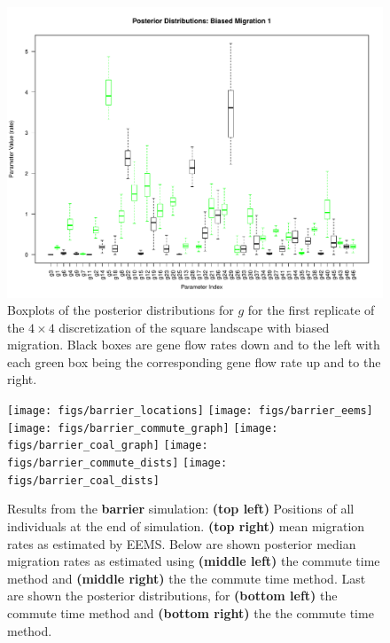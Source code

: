 \documentclass{article}
\begin{document}
\begin{figure}
\centering
 \includegraphics[scale=.6]{figs/post_dists_bias_4x4_1}
\caption{Boxplots of the posterior distributions for $g$ 
for the first replicate of the $4 \times 4$ discretization of the square landscape with biased migration.
Black boxes are gene flow rates down and to the left 
with each green box being the corresponding gene flow rate up and to the right.}
\label{fig:post_dists_bias_4x4_1}
\end{figure}

\begin{figure}
\centering
    \texttt{[image: figs/barrier\_locations]}
    \texttt{[image: figs/barrier\_eems]}
    \texttt{[image: figs/barrier\_commute\_graph]}
    \texttt{[image: figs/barrier\_coal\_graph]}
    \texttt{[image: figs/barrier\_commute\_dists]}
    \texttt{[image: figs/barrier\_coal\_dists]}
    \caption{
        Results from the \textbf{barrier} simulation:
        \textbf{(top left)} Positions of all individuals at the end of simulation.
        \textbf{(top right)} mean migration rates as estimated by EEMS.
        Below are shown
        posterior median migration rates 
            as estimated using 
            \textbf{(middle left)} the commute time method and
            \textbf{(middle right)} the the commute time method.
        Last are shown the posterior distributions, for
            \textbf{(bottom left)} the commute time method and
            \textbf{(bottom right)} the the commute time method.
        \label{sfig:barrier_results}
    }
\end{figure}
\end{document}
